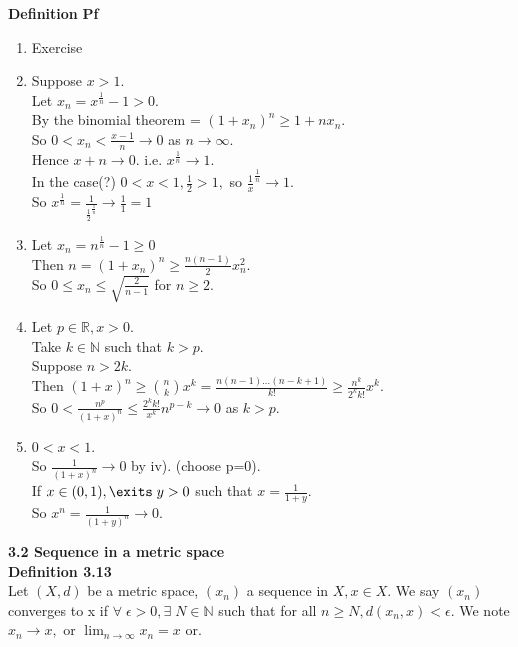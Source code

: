 \documentclass[12pt]{article}
\begin{document}
\begin{block}{\bf Definition}
\textbf{Pf}
\begin{enumerate}[label=(\roman*)]
    \item Exercise
    \item Suppose $x>1$.
    \\ Let $x_n = x^{\frac{1}{n}} - 1>0$.
    \\ By the binomial theorem = $(1+x_n)^n \ge 1+nx_n$.
    \\ So $0 < x_n < \frac{x-1}{n} \rightarrow 0$ as $n\rightarrow \infty$.
    \\ Hence $x+n \rightarrow 0$. i.e. $x^{\frac{1}{n}} \rightarrow 1$.
    \\ In the case(?) $0<x<1, \frac{1}{2} > 1,$ so $\frac{1}{x}^{\frac{1}{n}} \rightarrow 1$.
    \\ So $x^{\frac{1}{n}} = \frac{1}{\frac{1}{2}^{\frac{1}{n}}} \rightarrow \frac{1}{1} = 1$
    
    \item Let $x_n = n^{\frac{1}{n}} -1 \ge 0$
    \\ Then $n = (1+x_n)^n \ge \frac{n(n-1)}{2}x_n^2$.
    \\ So $0 \le x_n \le \sqrt{\frac{2}{n-1}}$ for $n\ge 2$.
    
    \item Let $p \in \mathbb{R}, x>0$.
    \\ Take $k \in \mathbb{N}$ such that $k > p$.
    \\ Suppose $n > 2k$.
    \\ Then $(1+x)^n \ge \binom{n}k x^k = \frac{n(n-1)\ldots(n-k+1)}{k!} \ge \frac{n^k}{2^k k!} x^k.$
    \\ So $0< \frac{n^p}{(1+x)^n} \le \frac{2^k k!}{x^k} n^{p-k} \rightarrow 0$ as $k > p$.
    
    \item $0<x<1$.
    \\ So $\frac{1}{(1+x)^n} \rightarrow 0$ by iv). (choose p=0).
    \\ If $x \in (0,1), \exits\; y>0$ such that $x = \frac{1}{1+y}$.
    \\ So $x^n = \frac{1}{(1+y)^n} \rightarrow 0$.
    
\end{enumerate}

\newpage
\textbf{3.2 Sequence in a metric space}\\
\textbf{Definition 3.13}\\
Let $(X,d)$ be a metric space, $(x_n)$ a sequence in $X, x \in X$. We say $(x_n)$ converges to x if $\forall\;\epsilon > 0, \exists\;N\in \mathbb{N}$ such that  for all $n\ge N, d(x_n,x) < \epsilon$. We note $x_n \rightarrow x,$ or $\lim_{n\rightarrow \infty} x_n = x$ or.\\


\end{block}
\end{document}
